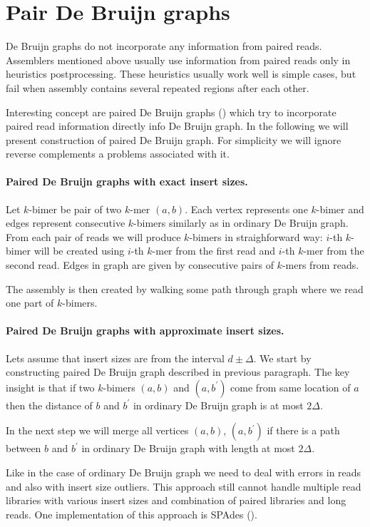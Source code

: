 \section{Pair De Bruijn graphs}

De Bruijn graphs do not incorporate any information from paired reads.
Assemblers mentioned above usually use information from paired reads only in heuristics postprocessing.
These heuristics usually work well is simple cases, but fail when assembly contains several repeated regions after each other.

Interesting concept are paired De Bruijn graphs (\cite{Paired}) which try to incorporate paired read
information directly info De Bruijn graph. In the following we will present construction of 
paired De Bruijn graph. For simplicity we will ignore reverse complements a problems associated with it.

\paragraph{Paired De Bruijn graphs with exact insert sizes.}
Let $k$-bimer be pair of two $k$-mer $(a, b)$. Each vertex represents one $k$-bimer and edges represent
consecutive $k$-bimers similarly as in ordinary De Bruijn graph. 
From each pair of reads we will produce $k$-bimers in straighforward way:
$i$-th $k$-bimer will be created using $i$-th $k$-mer from the first read and $i$-th $k$-mer from the second read.
Edges in graph are given by consecutive pairs of $k$-mers from reads.

The assembly is then created by walking some path through graph where we read one part of $k$-bimers.

\paragraph{Paired De Bruijn graphs with approximate insert sizes.}
Lets assume that insert sizes are from the interval $d \pm \Delta$.
We start by constructing paired De Bruijn graph described in previous paragraph.
The key insight is that if two $k$-bimers $(a, b)$ and $(a, b^{'})$ come from
same location of $a$ then the distance of $b$ and $b^{'}$ in ordinary De Bruijn graph is at most $2\Delta$.

In the next step we will merge all vertices $(a, b)$, $(a, b^{'})$ if there is a path
between $b$ and $b^{'}$ in ordinary De Bruijn graph with length at most $2\Delta$.

\bigskip
Like in the case of ordinary De Bruijn graph we need to deal with errors in reads
and also with insert size outliers. This approach still cannot handle multiple
read libraries with various insert sizes and combination of paired libraries and long reads.
One implementation of this approach is SPAdes (\cite{Spades}).


